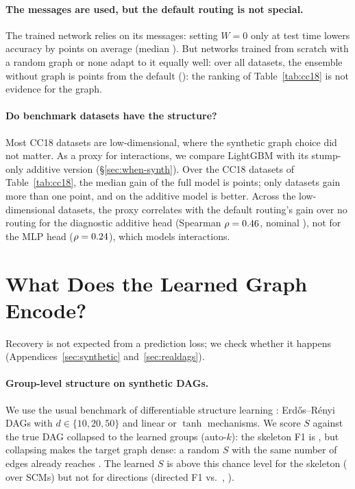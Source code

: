 \documentclass[anon,12pt]{clear2027} %
\begin{document}
\paragraph{The messages are used, but the default routing is not special.}
The trained network relies on its messages: setting $W=0$ only at test time lowers accuracy by \WZeroDrop{} points on average (median \WZeroDropMedian{}). But networks trained from scratch with a random graph or none adapt to it equally well: over all \RealPoolEnsNoneLearnedN{} datasets, the ensemble without graph is \RealPoolEnsNoneLearned{} points from the default (\RealPoolEnsNoneLearnedPe{}): the ranking of Table~\ref{tab:cc18} is not evidence for the graph.

\paragraph{Do benchmark datasets have the structure?}
\label{sec:when-interact}
Most CC18 datasets are low-dimensional, where the synthetic graph choice did not matter. As a proxy for interactions, we compare LightGBM with its stump-only additive version (\S\ref{sec:when-synth}). Over the \IntNTasks{} CC18 datasets of Table~\ref{tab:cc18}, the median gain of the full model is \IntMedian{} points; only \IntNGapOne{} datasets gain more than one point, and on \IntNNeg{} the additive model is better. Across the \RealNLow{} low-dimensional datasets, the proxy correlates with the default routing's gain over no routing for the diagnostic additive head (Spearman $\rho=0.46{}$, nominal \AddFtRhoPe{}), not for the MLP head ($\rho=0.24{}$), which models interactions.

\section{What Does the Learned Graph Encode?}
\label{sec:structure}

Recovery is not expected from a prediction loss; we check whether it happens (Appendices~\ref{sec:synthetic} and~\ref{sec:realdags}).

\paragraph{Group-level structure on synthetic DAGs.}
We use the usual benchmark of differentiable structure learning \citep{zheng2018dags}: Erd\H{o}s--R\'enyi DAGs with $d\in\{10,20,50\}$ and linear or $\tanh$ mechanisms. We score $S$ against the true DAG collapsed to the learned groups (auto-$k$): the skeleton F1 is \SynAutoSkelGrp{}, but collapsing makes the target graph dense: a random $S$ with the same number of edges already reaches \SynRandSkelGrp{}. The learned $S$ is above this chance level for the skeleton (\SynRandSkelPe{} over \SynRandN{} SCMs) but not for directions (directed F1 \SynAutoDirGrp{} vs.\ \SynRandDirGrp{}, \SynRandDirPe{}).
\end{document}
